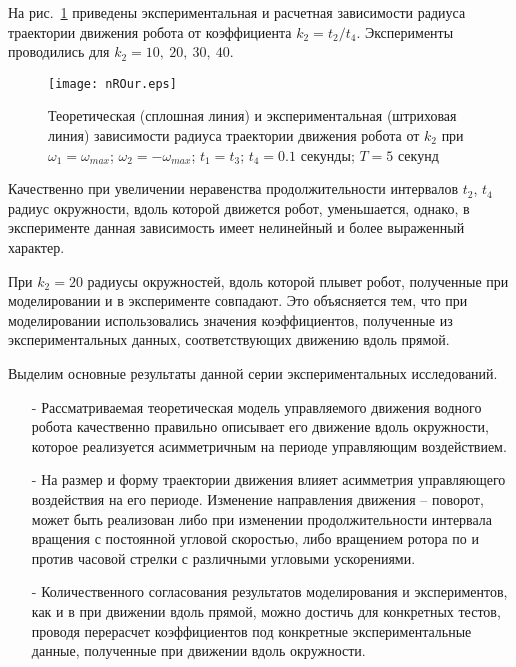 
На рис.~\ref{nROur} приведены экспериментальная и расчетная зависимости радиуса траектории движения робота от коэффициента $k_2 = t_2 / t_4$. Эксперименты проводились для $k_2 = 10,\ 20,\ 30,\ 40$.

\begin{figure}[!ht]
	\centering
	\texttt{[image: nROur.eps]}
	\caption{Теоретическая (сплошная линия) и экспериментальная (штриховая линия) зависимости радиуса траектории движения робота от $k_2$ при $\omega_1 = \omega_{max} $; $ \omega_2 = -\omega_{max} $; $ t_1=t_3 $; $ t_4=0.1 $ секунды; $ T = 5 $ секунд}
	\label{nROur}
\end{figure}

Качественно при увеличении неравенства продолжительности интервалов $t_2$, $t_4$ радиус окружности, вдоль которой движется робот, уменьшается, однако, в эксперименте данная зависимость имеет нелинейный и более выраженный характер.

При $k_2 = 20$ радиусы окружностей, вдоль которой плывет робот, полученные при моделировании и в эксперименте совпадают. Это объясняется тем, что при моделировании использовались значения   коэффициентов, полученные из экспериментальных данных, соответствующих движению вдоль прямой.

Выделим основные результаты данной серии экспериментальных исследований.

\begin{itemize}
	\item [-] Рассматриваемая теоретическая модель управляемого движения водного робота качественно правильно  описывает его движение вдоль окружности, которое реализуется асимметричным на периоде управляющим воздействием.
	
	\item [-] На размер и форму траектории движения влияет асимметрия управляющего воздействия на его периоде. Изменение направления движения -- поворот, может быть реализован либо при изменении продолжительности интервала вращения с постоянной угловой скоростью, либо вращением ротора по и против часовой стрелки с различными угловыми ускорениями.
	
	\item [-] Количественного согласования результатов моделирования и экспериментов, как и в при движении вдоль прямой, можно достичь для конкретных тестов, проводя перерасчет коэффициентов под конкретные экспериментальные данные, полученные при движении вдоль окружности.
	
\end{itemize}

